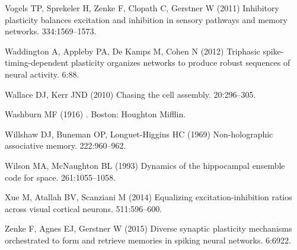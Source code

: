 \begin{thebibliography}{}
Vogels TP, Sprekeler H, Zenke F, Clopath C, Gerstner W (2011{\rm{}})
\newblock Inhibitory plasticity balances excitation and inhibition in sensory
  pathways and memory networks.
 334:1569--1573.

Waddington A, Appleby PA, De Kamps M, Cohen N (2012{\rm{}})
\newblock Triphasic spike-timing-dependent plasticity organizes networks to produce robust sequences of neural activity.
 6:88.

Wallace DJ, Kerr JND (2010{\rm{}})
\newblock Chasing the cell assembly.
 20:296--305.

Washburn MF (1916{\rm{}})
.
\newblock Boston: Houghton Mifflin.

Willshaw DJ, Buneman OP, Longuet-Higgins HC (1969{\rm{}})
\newblock Non-holographic associative memory.
 222:960--962.

Wilson MA, McNaughton BL (1993{\rm{}})
\newblock Dynamics of the hippocampal ensemble code for space.
 261:1055--1058.

Xue M, Atallah BV, Scanziani M (2014{\rm{}})
\newblock Equalizing excitation-inhibition ratios across visual cortical
  neurons.
 511:596--600.

Zenke F, Agnes EJ, Gerstner W (2015{\rm{}})
\newblock Diverse synaptic plasticity mechanisms orchestrated to form and retrieve memories in spiking neural networks.
 6:6922.



\end{thebibliography}


